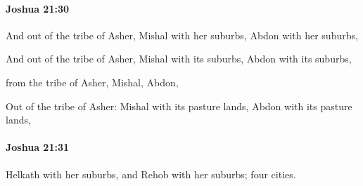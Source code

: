 		\paragraph{Joshua 21:30} %
			\label{JOSHUA-21-30}

			And out of the tribe of Asher, Mishal with her suburbs, Abdon with her suburbs,

			\begin{versebox}
					\item[BHS] 
					\item[ASV] And out of the tribe of Asher, Mishal with its suburbs, Abdon with its suburbs,
					\item[NIV] from the tribe of Asher, Mishal, Abdon,
					\item[NRSV] Out of the tribe of Asher: Mishal with its pasture lands, Abdon with its pasture lands,
			\end{versebox}

		\paragraph{Joshua 21:31} %
			\label{JOSHUA-21-31}

			Helkath with her suburbs, and Rehob with her suburbs; four cities.

